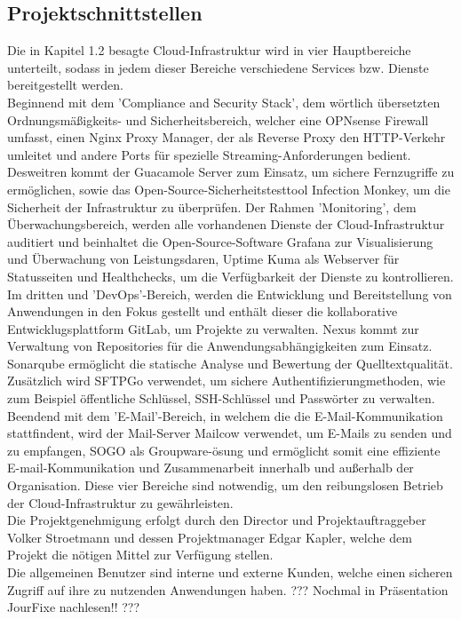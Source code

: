 \subsection{Projektschnittstellen} 
\label{sec:Projektschnittstellen}
Die in Kapitel 1.2 besagte Cloud-Infrastruktur wird in vier Hauptbereiche unterteilt, sodass in jedem 
dieser Bereiche verschiedene Services bzw. Dienste bereitgestellt werden. 
\\Beginnend mit dem 'Compliance and Security Stack', dem wörtlich übersetzten Ordnungsmäßigkeits- und 
Sicherheitsbereich, welcher eine OPNsense Firewall umfasst, einen Nginx Proxy Manager, der als 
Reverse Proxy den HTTP-Verkehr umleitet und andere Ports für spezielle Streaming-Anforderungen bedient. 
Desweitren kommt der Guacamole Server zum Einsatz, um sichere Fernzugriffe zu ermöglichen, sowie das 
Open-Source-Sicherheitstesttool Infection Monkey, um die Sicherheit der Infrastruktur zu überprüfen. 
Der Rahmen 'Monitoring', dem Überwachungsbereich, werden alle vorhandenen Dienste der Cloud-Infrastruktur 
auditiert und beinhaltet die Open-Source-Software Grafana zur Visualisierung und Überwachung von 
Leistungsdaren, Uptime Kuma als Webserver für Statusseiten und Healthchecks, um die Verfügbarkeit 
der Dienste zu kontrollieren. 
Im dritten und 'DevOps'-Bereich, werden die Entwicklung und Bereitstellung von Anwendungen in den 
Fokus gestellt und enthält dieser die kollaborative Entwicklugsplattform GitLab, um Projekte zu 
verwalten. Nexus kommt zur Verwaltung von Repositories für die Anwendungsabhängigkeiten zum Einsatz. 
Sonarqube ermöglicht die statische Analyse und Bewertung der Quelltextqualität. Zusätzlich wird SFTPGo 
verwendet, um sichere Authentifizierungmethoden, wie zum Beispiel öffentliche Schlüssel, SSH-Schlüssel 
und Passwörter zu verwalten. 
Beendend mit dem 'E-Mail'-Bereich, in welchem die die E-Mail-Kommunikation stattfindent, wird der 
Mail-Server Mailcow verwendet, um E-Mails zu senden und zu empfangen, SOGO als Groupware-ösung und 
ermöglicht somit eine effiziente E-mail-Kommunikation und Zusammenarbeit innerhalb und außerhalb der Organisation. 
Diese vier Bereiche sind notwendig, um den reibungslosen Betrieb der Cloud-Infrastruktur zu gewährleisten.
\\Die Projektgenehmigung erfolgt durch den Director und Projektauftraggeber Volker Stroetmann und dessen 
Projektmanager Edgar Kapler, welche dem Projekt die nötigen Mittel zur Verfügung stellen.
\\Die allgemeinen Benutzer sind interne und externe Kunden, welche einen sicheren Zugriff auf ihre 
zu nutzenden Anwendungen haben. ??? Nochmal in Präsentation JourFixe nachlesen!! ???
